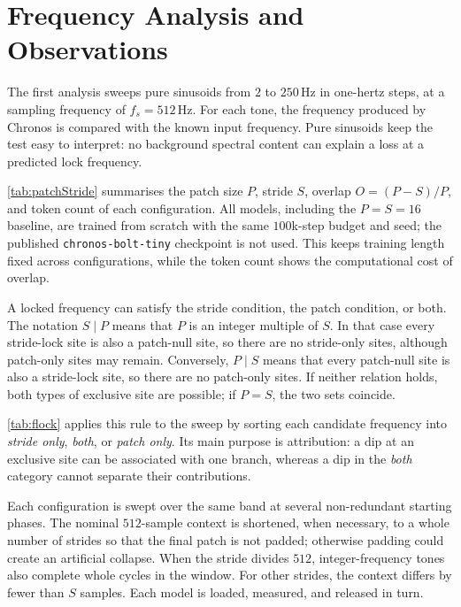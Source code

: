 \section{Frequency Analysis and Observations}
\label{sec:analysis}

The first analysis sweeps pure sinusoids from $2$ to $250$\,Hz in one-hertz steps, at a sampling frequency of $f_s=512$\,Hz. For each tone, the frequency produced by Chronos is compared with the known input frequency. Pure sinusoids keep the test easy to interpret: no background spectral content can explain a loss at a predicted lock frequency.



\autoref{tab:patchStride} summarises the patch size $P$, stride $S$, overlap $O=(P-S)/P$, and token count of each configuration. All models, including the $P{=}S{=}16$ baseline, are trained from scratch with the same $100$k-step budget and seed; the published \texttt{chronos-bolt-tiny} checkpoint is not used. This keeps training length fixed across configurations, while the token count shows the computational cost of overlap.

A locked frequency can satisfy the stride condition, the patch condition, or both. The notation $S\mid P$ means that $P$ is an integer multiple of $S$. In that case every stride-lock site is also a patch-null site, so there are no stride-only sites, although patch-only sites may remain. Conversely, $P\mid S$ means that every patch-null site is also a stride-lock site, so there are no patch-only sites. If neither relation holds, both types of exclusive site are possible; if $P=S$, the two sets coincide.

\autoref{tab:flock} applies this rule to the sweep by sorting each candidate frequency into \emph{stride only}, \emph{both}, or \emph{patch only}. Its main purpose is attribution: a dip at an exclusive site can be associated with one branch, whereas a dip in the \emph{both} category cannot separate their contributions.

Each configuration is swept over the same band at several non-redundant starting phases. The nominal $512$-sample context is shortened, when necessary, to a whole number of strides so that the final patch is not padded; otherwise padding could create an artificial collapse. When the stride divides $512$, integer-frequency tones also complete whole cycles in the window. For other strides, the context differs by fewer than $S$ samples. Each model is loaded, measured, and released in turn.

